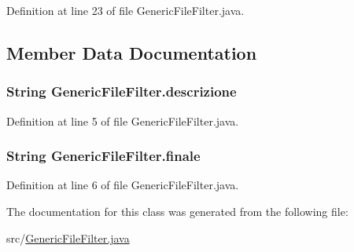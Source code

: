 Definition at line 23 of file Generic\-File\-Filter.\-java.



\subsection{Member Data Documentation}
\hypertarget{class_generic_file_filter_a9953e3b3aa3dee91452cb9c2ad80822b}{
\subsubsection[{descrizione}]{\setlength{\rightskip}{0pt plus 5cm}String {\bf Generic\-File\-Filter.\-descrizione}}}\label{class_generic_file_filter_a9953e3b3aa3dee91452cb9c2ad80822b}


Definition at line 5 of file Generic\-File\-Filter.\-java.

\hypertarget{class_generic_file_filter_a9468f04e6ea80d41e6bc69b59769b751}{
\subsubsection[{finale}]{\setlength{\rightskip}{0pt plus 5cm}String {\bf Generic\-File\-Filter.\-finale}}}\label{class_generic_file_filter_a9468f04e6ea80d41e6bc69b59769b751}


Definition at line 6 of file Generic\-File\-Filter.\-java.



The documentation for this class was generated from the following file\-:\begin{DoxyCompactItemize}
\item 
src/\hyperlink{_generic_file_filter_8java}{Generic\-File\-Filter.\-java}\end{DoxyCompactItemize}
